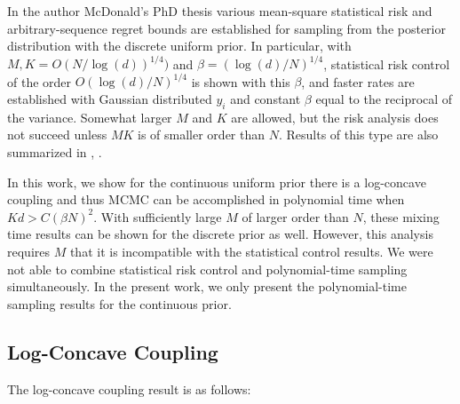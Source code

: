 \documentclass{article}
\numberwithin{equation}{section}
\theoremstyle{Lemma}
\theoremstyle{Corollary}
\theoremstyle{Theorem}
\theoremstyle{Remark}
\begin{document}
In the author McDonald's PhD thesis \cite{mcdonald2025computation_thesis} various mean-square statistical risk and arbitrary-sequence regret bounds are established for sampling from the posterior distribution with the discrete uniform prior. In particular,  with $M,K = O(N/\log(d))^{1/4})$ and $\beta = (\log(d)/N)^{1/4}$, statistical risk control of the order $O(\log(d)/N)^{1/4}$ is shown with this $\beta$, and faster rates are established with Gaussian distributed $y_i$ and constant $\beta$ equal to the reciprocal of the variance. 
 Somewhat larger $M$ and $K$ are allowed, but the risk analysis does not succeed unless $MK$ is of smaller order than $N$. Results of this type are also summarized in \cite{barron2024shannon}, \cite{barron2024log}. 

In this work, we show for the continuous uniform prior there is a log-concave coupling and thus MCMC can be accomplished in polynomial time when $Kd> C(\beta N)^{2}$. With sufficiently large $M$ of larger order than $N$, these mixing time results can be shown for the discrete prior as well. However, this analysis requires $M$ that it is incompatible with the statistical control results. We were not able to combine statistical risk control and polynomial-time sampling simultaneously. In the present work, we only present the polynomial-time sampling results for the continuous prior. 

\subsection{Log-Concave Coupling}
The log-concave coupling result is as follows:
\end{document}
